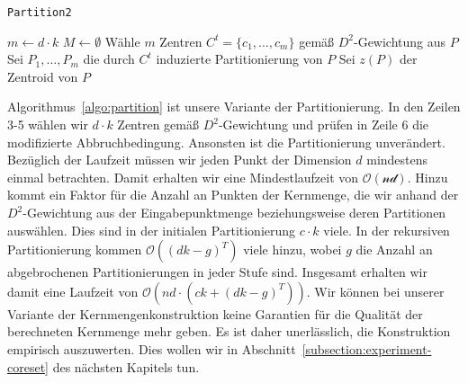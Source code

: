\begin{algorithm}
\caption{\texttt{Partition2}}
\label{algo:partition}
	\DontPrintSemicolon
	
	\BlankLine
	
	$m \leftarrow d \cdot k$\;
	$M \leftarrow \emptyset$\;
	Wähle $m$ Zentren $C^t = \{c_1, \dots, c_m\}$ gemäß $D^2$-Gewichtung aus $P$\;
	Sei $P_1, \dots, P_m$ die durch $C^t$ induzierte Partitionierung von $P$\;
	Sei $z(P)$ der Zentroid von $P$\;
\end{algorithm}
Algorithmus~\ref{algo:partition} ist unsere Variante der Partitionierung. In den Zeilen 3-5 wählen wir $d \cdot k$ Zentren
gemäß $D^2$-Gewichtung und prüfen in Zeile 6 die modifizierte Abbruchbedingung. Ansonsten ist die Partitionierung unverändert.
\absatz
Bezüglich der Laufzeit müssen wir jeden Punkt der Dimension $d$ mindestens einmal betrachten. Damit erhalten wir eine
Mindestlaufzeit von $\mathcal{O(nd)}$. Hinzu kommt ein Faktor für die Anzahl an Punkten der Kernmenge, die wir anhand der
$D^2$-Gewichtung aus der Eingabepunktmenge beziehungsweise deren Partitionen auswählen. Dies sind in der initialen
Partitionierung $c \cdot k$ viele. In der rekursiven Partitionierung kommen $\mathcal{O}( (dk - g)^T )$ viele hinzu, wobei
$g$ die Anzahl an abgebrochenen Partitionierungen in jeder Stufe sind. Insgesamt erhalten wir damit eine Laufzeit von
$\mathcal{O}\left( nd \cdot \left( ck + \left( dk - g \right)^T \right) \right)$.
\absatz
Wir können bei unserer Variante der Kernmengenkonstruktion keine Garantien für die Qualität der berechneten
Kernmenge mehr geben. Es ist daher unerlässlich, die Konstruktion empirisch auszuwerten. Dies wollen wir in
Abschnitt~\ref{subsection:experiment-coreset} des nächsten Kapitels tun.